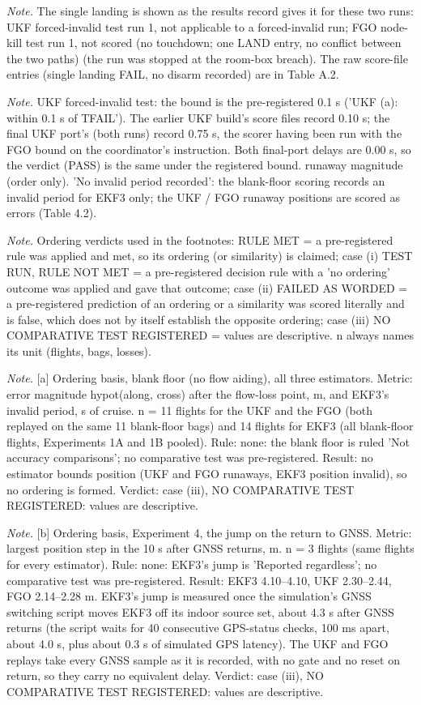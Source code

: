 \begin{table}[htbp]
\textit{Note.} \textdaggerdbl{} The single landing is shown as the results record gives it for these two runs: UKF forced-invalid test run 1, not applicable to a forced-invalid run; FGO node-kill test run 1, not scored (no touchdown; one LAND entry, no conflict between the two paths) (the run was stopped at the room-box breach). The raw score-file entries (single landing FAIL, no disarm recorded) are in Table A.2.\par
\textit{Note.} UKF forced-invalid test: the bound is the pre-registered 0.1 s ('UKF (a): within 0.1 s of TFAIL'). The earlier UKF build's score files record 0.10 s; the final UKF port's (both runs) record 0.75 s, the scorer having been run with the FGO bound on the coordinator's instruction. Both final-port delays are 0.00 s, so the verdict (PASS) is the same under the registered bound. \textdagger{} runaway magnitude (order only). 'No invalid period recorded': the blank-floor scoring records an invalid period for EKF3 only; the UKF / FGO runaway positions are scored as errors (Table 4.2).\par
\textit{Note.} Ordering verdicts used in the footnotes: RULE MET = a pre-registered rule was applied and met, so its ordering (or similarity) is claimed; case (i) TEST RUN, RULE NOT MET = a pre-registered decision rule with a 'no ordering' outcome was applied and gave that outcome; case (ii) FAILED AS WORDED = a pre-registered prediction of an ordering or a similarity was scored literally and is false, which does not by itself establish the opposite ordering; case (iii) NO COMPARATIVE TEST REGISTERED = values are descriptive. n always names its unit (flights, bags, losses).\par
\textit{Note.} [a] Ordering basis, blank floor (no flow aiding), all three estimators. Metric: error magnitude hypot(along, cross) after the flow-loss point, m, and EKF3's invalid period, s of cruise. n = 11 flights for the UKF and the FGO (both replayed on the same 11 blank-floor bags) and 14 flights for EKF3 (all blank-floor flights, Experiments 1A and 1B pooled). Rule: none: the blank floor is ruled 'Not accuracy comparisons'; no comparative test was pre-registered. Result: no estimator bounds position (UKF and FGO runaways, EKF3 position invalid), so no ordering is formed. Verdict: case (iii), NO COMPARATIVE TEST REGISTERED: values are descriptive.\par
\textit{Note.} [b] Ordering basis, Experiment 4, the jump on the return to GNSS. Metric: largest position step in the 10 s after GNSS returns, m. n = 3 flights (same flights for every estimator). Rule: none: EKF3's jump is 'Reported regardless'; no comparative test was pre-registered. Result: EKF3 4.10--4.10, UKF 2.30--2.44, FGO 2.14--2.28 m. EKF3's jump is measured once the simulation's GNSS switching script moves EKF3 off its indoor source set, about 4.3 s after GNSS returns (the script waits for 40 consecutive GPS-status checks, 100 ms apart, about 4.0 s, plus about 0.3 s of simulated GPS latency). The UKF and FGO replays take every GNSS sample as it is recorded, with no gate and no reset on return, so they carry no equivalent delay. Verdict: case (iii), NO COMPARATIVE TEST REGISTERED: values are descriptive.\par

\end{table}
